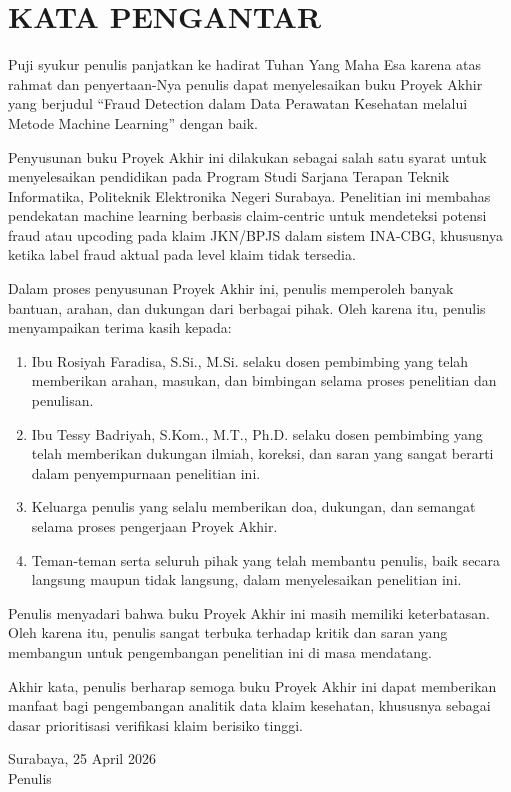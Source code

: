\cleardoublepage
\chapter*{KATA PENGANTAR}
\thispagestyle{fancy}

Puji syukur penulis panjatkan ke hadirat Tuhan Yang Maha Esa karena atas rahmat dan penyertaan-Nya penulis dapat menyelesaikan buku Proyek Akhir yang berjudul ``Fraud Detection dalam Data Perawatan Kesehatan melalui Metode Machine Learning'' dengan baik.

Penyusunan buku Proyek Akhir ini dilakukan sebagai salah satu syarat untuk menyelesaikan pendidikan pada Program Studi Sarjana Terapan Teknik Informatika, Politeknik Elektronika Negeri Surabaya. Penelitian ini membahas pendekatan machine learning berbasis claim-centric untuk mendeteksi potensi fraud atau upcoding pada klaim JKN/BPJS dalam sistem INA-CBG, khususnya ketika label fraud aktual pada level klaim tidak tersedia.

Dalam proses penyusunan Proyek Akhir ini, penulis memperoleh banyak bantuan, arahan, dan dukungan dari berbagai pihak. Oleh karena itu, penulis menyampaikan terima kasih kepada:

\begin{enumerate}[label=\arabic*., leftmargin=*]
  \item Ibu Rosiyah Faradisa, S.Si., M.Si. selaku dosen pembimbing yang telah memberikan arahan, masukan, dan bimbingan selama proses penelitian dan penulisan.
  \item Ibu Tessy Badriyah, S.Kom., M.T., Ph.D. selaku dosen pembimbing yang telah memberikan dukungan ilmiah, koreksi, dan saran yang sangat berarti dalam penyempurnaan penelitian ini.
  \item Keluarga penulis yang selalu memberikan doa, dukungan, dan semangat selama proses pengerjaan Proyek Akhir.
  \item Teman-teman serta seluruh pihak yang telah membantu penulis, baik secara langsung maupun tidak langsung, dalam menyelesaikan penelitian ini.
\end{enumerate}

Penulis menyadari bahwa buku Proyek Akhir ini masih memiliki keterbatasan. Oleh karena itu, penulis sangat terbuka terhadap kritik dan saran yang membangun untuk pengembangan penelitian ini di masa mendatang.

Akhir kata, penulis berharap semoga buku Proyek Akhir ini dapat memberikan manfaat bagi pengembangan analitik data klaim kesehatan, khususnya sebagai dasar prioritisasi verifikasi klaim berisiko tinggi.

\vspace{1cm}
\begin{flushright}
Surabaya, 25 April 2026\\[1.5cm]
Penulis
\end{flushright}
